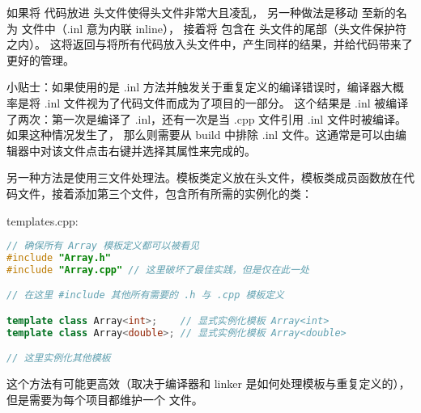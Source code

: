 \documentclass[../../LearnCpp.tex]{subfiles}
\begin{document}
如果将  代码放进  头文件使得头文件非常大且凌乱，
另一种做法是移动  至新的名为  文件中（.inl 意为内联 inline），
接着将  包含在  头文件的尾部（头文件保护符之内）。
这将返回与将所有代码放入头文件中，产生同样的结果，并给代码带来了更好的管理。

小贴士：如果使用的是 .inl 方法并触发关于重复定义的编译错误时，编译器大概率是将 .inl 文件视为了代码文件而成为了项目的一部分。
这个结果是 .inl 被编译了两次：第一次是编译了 .inl，还有一次是当 .cpp 文件引用 .inl 文件时被编译。如果这种情况发生了，
那么则需要从 build 中排除 .inl 文件。这通常是可以由编辑器中对该文件点击右键并选择其属性来完成的。

另一种方法是使用三文件处理法。模板类定义放在头文件，模板类成员函数放在代码文件，接着添加第三个文件，包含所有所需的实例化的类：

templates.cpp:

\begin{lstlisting}[language=C++]
// 确保所有 Array 模板定义都可以被看见
#include "Array.h"
#include "Array.cpp" // 这里破坏了最佳实践，但是仅在此一处

// 在这里 #include 其他所有需要的 .h 与 .cpp 模板定义

template class Array<int>;    // 显式实例化模板 Array<int>
template class Array<double>; // 显式实例化模板 Array<double>

// 这里实例化其他模板
\end{lstlisting}

这个方法有可能更高效（取决于编译器和 linker 是如何处理模板与重复定义的），
但是需要为每个项目都维护一个  文件。
\end{document}
